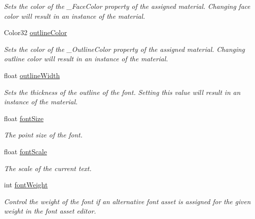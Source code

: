 \begin{DoxyCompactItemize}
\begin{DoxyCompactList}\small\item\em Sets the color of the \+\_\+\+Face\+Color property of the assigned material. Changing face color will result in an instance of the material. \end{DoxyCompactList}\item 
Color32 \mbox{\hyperlink{class_t_m_pro_1_1_t_m_p___text_a3aeff3153a0ba4bdaeca172f630ee047}{outline\+Color}}
\begin{DoxyCompactList}\small\item\em Sets the color of the \+\_\+\+Outline\+Color property of the assigned material. Changing outline color will result in an instance of the material. \end{DoxyCompactList}\item 
float \mbox{\hyperlink{class_t_m_pro_1_1_t_m_p___text_af06ac98d6059319b0372b8f993759653}{outline\+Width}}
\begin{DoxyCompactList}\small\item\em Sets the thickness of the outline of the font. Setting this value will result in an instance of the material. \end{DoxyCompactList}\item 
float \mbox{\hyperlink{class_t_m_pro_1_1_t_m_p___text_a87683b2b2c721200b2822d16c0ce3dee}{font\+Size}}
\begin{DoxyCompactList}\small\item\em The point size of the font. \end{DoxyCompactList}\item 
float \mbox{\hyperlink{class_t_m_pro_1_1_t_m_p___text_abf3c8050ad39a6a25615082085d4d05b}{font\+Scale}}
\begin{DoxyCompactList}\small\item\em The scale of the current text. \end{DoxyCompactList}\item 
int \mbox{\hyperlink{class_t_m_pro_1_1_t_m_p___text_a571c8cac097b25de7c9cea8da1c27d47}{font\+Weight}}
\begin{DoxyCompactList}\small\item\em Control the weight of the font if an alternative font asset is assigned for the given weight in the font asset editor. \end{DoxyCompactList}\item 

\end{DoxyCompactItemize}
